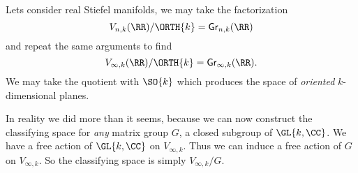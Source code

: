 Lets consider real Stiefel manifolds, we may take the
factorization
\begin{equation}
V_{n,k}(\RR)/\ORTH{k}=\Gr_{n,k}(\RR)
\end{equation}
and repeat the same arguments to find
\begin{equation}
V_{\infty,k}(\RR)/\ORTH{k}=\Gr_{\infty,k}(\RR).
\end{equation}
We may take the quotient with $\SO{k}$ which produces the space
of \emph{oriented} $k$-dimensional planes. 

In reality we did more than it seems, because we can now
construct the classifying space for \emph{any} matrix group $G$,
a closed subgroup of $\GL{k,\CC}$. We have a free action of
$\GL{k,\CC}$ on $V_{\infty,k}$. Thus we can induce a free action
of $G$ on $V_{\infty,k}$. So the classifying space is simply
$V_{\infty,k}/G$. 

